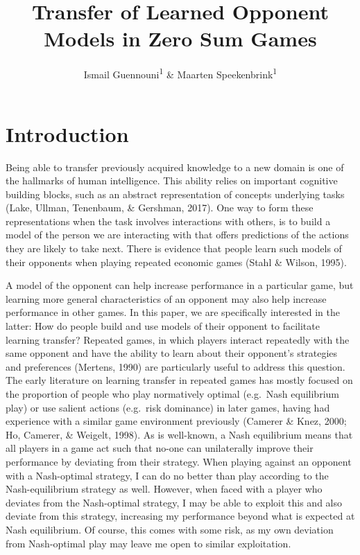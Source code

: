\documentclass[english,man,floatsintext]{apa6}
\title{Transfer of Learned Opponent Models in Zero Sum Games}
\author{Ismail Guennouni\textsuperscript{1} \& Maarten Speekenbrink\textsuperscript{1}}
\date{}
\affiliation{\vspace{0.5cm}\textsuperscript{1} Department of Experimental Psychology, University College London}
\begin{document}
\maketitle

\hypertarget{introduction}{%
\section{Introduction}\label{introduction}}

Being able to transfer previously acquired knowledge to a new domain is one of the hallmarks of human intelligence. This ability relies on important cognitive building blocks, such as an abstract representation of concepts underlying tasks (Lake, Ullman, Tenenbaum, \& Gershman, 2017). One way to form these representations when the task involves interactions with others, is to build a model of the person we are interacting with that offers predictions of the actions they are likely to take next. There is evidence that people learn such models of their opponents when playing repeated economic games (Stahl \& Wilson, 1995).

A model of the opponent can help increase performance in a particular game, but learning more general characteristics of an opponent may also help increase performance in other games. In this paper, we are specifically interested in the latter: How do people build and use models of their opponent to facilitate learning transfer? Repeated games, in which players interact repeatedly with the same opponent and have the ability to learn about their opponent's strategies and preferences (Mertens, 1990) are particularly useful to address this question. The early literature on learning transfer in repeated games has mostly focused on the proportion of people who play normatively optimal (e.g.~Nash equilibrium play) or use salient actions (e.g.~risk dominance) in later games, having had experience with a similar game environment previously (Camerer \& Knez, 2000; Ho, Camerer, \& Weigelt, 1998). As is well-known, a Nash equilibrium means that all players in a game act such that no-one can unilaterally improve their performance by deviating from their strategy. When playing against an opponent with a Nash-optimal strategy, I can do no better than play according to the Nash-equilibrium strategy as well. However, when faced with a player who deviates from the Nash-optimal strategy, I may be able to exploit this and also deviate from this strategy, increasing my performance beyond what is expected at Nash equilibrium. Of course, this comes with some risk, as my own deviation from Nash-optimal play may leave me open to similar exploitation.
\end{document}
